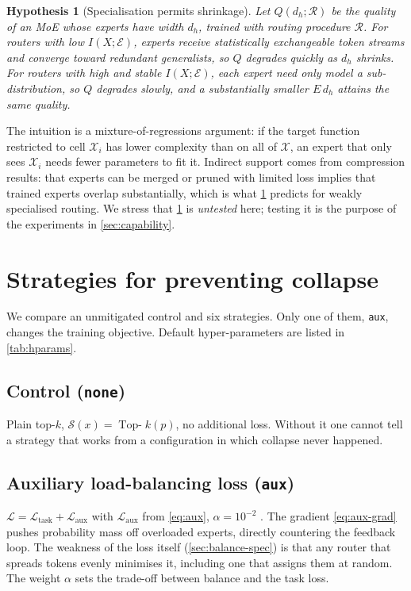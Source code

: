 \documentclass[10pt]{article}
\newtheorem{hypothesis}{Hypothesis}
\theoremstyle{definition}
\theoremstyle{remark}
\newcommand{\topk}{\operatorname{Top-}k}
\newcommand{\Laux}{\mathcal{L}_{\mathrm{aux}}}
\newcommand{\Ltask}{\mathcal{L}_{\mathrm{task}}}
\newcommand{\code}[1]{\texttt{#1}}
\begin{document}
\begin{hypothesis}[Specialisation permits shrinkage]
\label{hyp:shrink}
Let $Q(d_h;\mathcal{R})$ be the quality of an MoE whose experts have width $d_h$, trained with routing procedure $\mathcal{R}$. For routers with low $I(X;\mathcal{E})$, experts receive statistically exchangeable token streams and converge toward redundant generalists, so $Q$ degrades quickly as $d_h$ shrinks. For routers with high and stable $I(X;\mathcal{E})$, each expert need only model a sub-distribution, so $Q$ degrades slowly, and a substantially smaller $E\,d_h$ attains the same quality.
\end{hypothesis}

The intuition is a mixture-of-regressions argument: if the target function restricted to cell $\mathcal{X}_i$ has lower complexity than on all of $\mathcal{X}$, an expert that only sees $\mathcal{X}_i$ needs fewer parameters to fit it. Indirect support comes from compression results: that experts can be merged \citep{li2024mcsmoe} or pruned \citep{lu2024notall} with limited loss implies that trained experts overlap substantially, which is what \cref{hyp:shrink} predicts for weakly specialised routing. We stress that \cref{hyp:shrink} is \emph{untested} here; testing it is the purpose of the experiments in \cref{sec:capability}.

\section{Strategies for preventing collapse}
\label{sec:methods}

We compare an unmitigated control and six strategies. Only one of them, \code{aux}, changes the training objective. Default hyper-parameters are listed in \cref{tab:hparams}.

\subsection{Control (\code{none})}
\label{sec:control}
Plain top-$k$, $\mathcal{S}(x)=\topk(p)$, no additional loss. Without it one cannot tell a strategy that works from a configuration in which collapse never happened.

\subsection{Auxiliary load-balancing loss (\code{aux})}
$\mathcal{L}=\Ltask+\Laux$ with $\Laux$ from \eqref{eq:aux}, $\alpha=10^{-2}$ \citep{fedus2022switch}. The gradient \eqref{eq:aux-grad} pushes probability mass off overloaded experts, directly countering the feedback loop. The weakness of the loss itself (\cref{sec:balance-spec}) is that any router that spreads tokens evenly minimises it, including one that assigns them at random. The weight $\alpha$ sets the trade-off between balance and the task loss.
\end{document}
